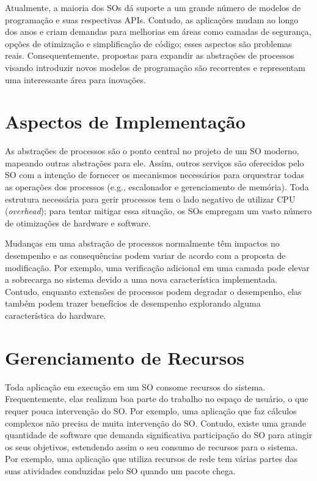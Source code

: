 Atualmente, a maioria dos SOs dá suporte a um grande número de modelos de
programação e suas respectivas APIs. Contudo, as aplicações mudam ao longo dos
anos e criam demandas para melhorias em áreas como camadas de segurança, opções
de otimização e simplificação de código; esses aspectos são problemas reais.
Consequentemente, propostas para expandir as abstrações de processos visando
introduzir novos modelos de programação são recorrentes e representam uma
interessante área para inovações.

\section{Aspectos de Implementação}

As abstrações de processos são o ponto central no projeto de um SO moderno,
mapeando outras abstrações para ele. Assim, outros serviços são oferecidos pelo
SO com a intenção de fornecer os mecanismos necessários para orquestrar todas
as operações dos processos (e.g., escalonador e gerenciamento de memória). Toda
estrutura necessária para gerir processos tem o lado negativo de utilizar CPU
(\emph{overhead}); para tentar mitigar essa situação, os SOs empregam um vasto
número de otimizações de hardware e software.

Mudanças em uma abstração de processos normalmente têm impactos no desempenho e
as consequências podem variar de acordo com a proposta de modificação. Por
exemplo, uma verificação adicional em uma camada pode elevar a sobrecarga no
sistema devido a uma nova característica implementada. Contudo, enquanto
extensões de processos podem degradar o desempenho, elas também podem trazer
benefícios de desempenho explorando alguma característica do hardware.

\section{Gerenciamento de Recursos}

Toda aplicação em execução em um SO consome recursos do sistema.
Frequentemente, elas realizam boa parte do trabalho no espaço de usuário, o que
requer pouca intervenção do SO. Por exemplo, uma aplicação que faz cálculos
complexos não precisa de muita intervenção do SO. Contudo, existe uma grande
quantidade de software que demanda significativa participação do SO para
atingir os seus objetivos, estendendo assim o seu consumo de recursos para o
sistema. Por exemplo, uma aplicação que utiliza recursos de rede tem várias
partes das suas atividades conduzidas pelo SO quando um pacote chega.

